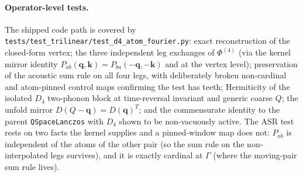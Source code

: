 \documentclass[11pt,a4paper]{article}
\newcommand{\qv}{\mathbf{q}}
\newcommand{\kv}{\mathbf{k}}
\begin{document}
\paragraph{Operator-level tests.}
The shipped code path is covered by
\texttt{tests/test\_trilinear/test\_d4\_atom\_fourier.py}: exact
reconstruction of the closed-form vertex; the three independent leg
exchanges of $\Phi^{(4)}$ (via the kernel mirror identity
$P_{ab}(\qv,\kv)=P_{ba}(-\qv,-\kv)$ and at the vertex level); preservation
of the acoustic sum rule on all four legs, with deliberately broken
non-cardinal and atom-pinned control maps confirming the test has teeth;
Hermiticity of the isolated $D_4$ two-phonon block at time-reversal
invariant and generic coarse $Q$; the unfold mirror
$D(Q-\qv)=D(\qv)^T$; and the commensurate identity to the parent
\texttt{QSpaceLanczos} with $D_4$ shown to be non-vacuously active.  The
ASR test rests on two facts the kernel supplies and a pinned-window map
does not: $P_{ab}$ is independent of the atoms of the other pair (so the
sum rule on the non-interpolated legs survives), and it is exactly cardinal
at $\Gamma$ (where the moving-pair sum rule lives).
\end{document}
